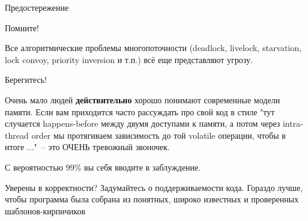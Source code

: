 \begin{frame}{Предостережение}

Помните! 

\pause
Все алгоритмические проблемы многопоточности (deadlock, livelock, starvation, lock convoy, priority inversion и т.п.) всё еще представляют угрозу.

\pause
Берегитесь! 

\pause
Очень мало людей \textbf{действительно} хорошо понимают современные модели памяти. Если вам приходится часто рассуждать про свой код в стиле "тут случается happens-before между двумя доступами к памяти, а потом через intra-thread order мы протягиваем зависимость до той volatile операции, чтобы в итоге ..."\ -- это ОЧЕНЬ тревожный звоночек. 

\pause
С вероятностью 99\% вы себя вводите в заблуждение. 

\pause
Уверены в корректности? Задумайтесь о поддерживаемости кода. Гораздо лучше, чтобы программа была собрана из понятных, широко известных и проверенных шаблонов-кирпичиков

\end{frame}







